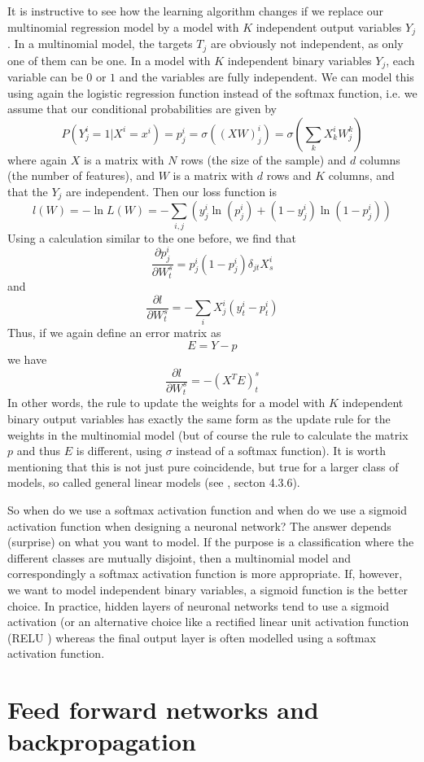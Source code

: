 \documentclass[a4paper, draft]{report}
\numberwithin{section}{chapter}
\numberwithin{equation}{chapter}
\theoremstyle{own}
\theoremstyle{remark}
\begin{document}
It is instructive to see how the learning algorithm changes if we replace our multinomial regression model by a model with $K$ independent output variables $Y_j$. In a multinomial model, the targets $T_j$ are obviously not independent, as only one of them can be one. In a model with $K$ independent binary variables $Y_j$, each variable can be $0$ or $1$ and the variables are fully independent. We can model this using again the logistic regression function instead of the softmax function, i.e. we assume that our conditional probabilities are given by
$$
P(Y^i_j = 1 | X^i = x^i) = p^i_j = \sigma((XW)^i_j) = \sigma(\sum_k X^i_k W^k_j)
$$
where again $X$ is a matrix with $N$ rows (the size of the sample) and $d$ columns (the number of features), and $W$ is a matrix with $d$ rows and $K$ columns, and that the $Y_j$ are independent. Then our loss function is
$$
l(W) = - \ln L(W) = - \sum_{i,j} ( y^i_j \ln(p^i_j) +  (1 - y^i_j) \ln (1-p^i_j))
$$
Using a calculation similar to the one before, we find that
$$
\frac{\partial p^i_j}{\partial W^s_t} = p^i_j (1-p^i_j) \delta_{jt} X^i_s
$$
and
$$
\frac{\partial l}{\partial W^s_t} = - \sum_i X^i_j (y^i_t - p^i_t)
$$
Thus, if we again define an error matrix as
$$
E = Y - p
$$
we have
$$
\frac{\partial l}{\partial W^s_t} = - (X^T E)^s_t
$$
In other words, the rule to update the weights for a model with $K$ independent binary output variables has exactly the same form as the update rule for the weights in the multinomial model (but of course the rule to calculate the matrix $p$ and thus $E$ is different, using $\sigma$ instead of a softmax function). It is worth mentioning that this is not just pure coincidende, but true for a larger class of models, so called general linear models (see \cite{Bishop}, secton 4.3.6).

So when do we use a softmax activation function and when do we use a sigmoid activation function when designing a neuronal network? The answer depends (surprise) on what you want to model. If the purpose is a classification where the different classes are mutually disjoint, then a multinomial model and correspondingly a softmax activation function is more appropriate. If, however, we want to model independent binary variables, a sigmoid function is the better choice. In practice, hidden layers of neuronal networks tend to use a sigmoid activation (or an alternative choice like a rectified linear unit activation function (RELU ) whereas the final output layer is often modelled using a softmax activation function. 

\chapter{Feed forward networks and backpropagation}
\end{document}
